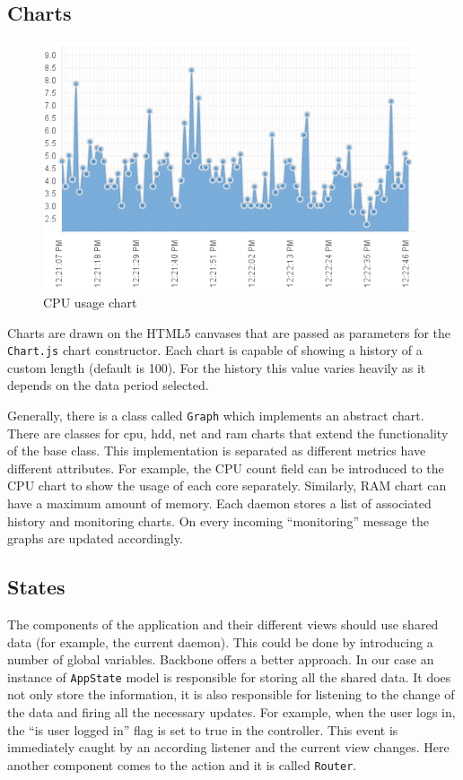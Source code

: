 \documentclass{l3proj}
\begin{document}
\subsection{Charts}

\begin{figure}[H]
\centering
\includegraphics[width=110mm]{images/cpu.png}
\caption{CPU usage chart}
\label{fig:CPUusage}
\end{figure}

Charts are drawn on the HTML5 canvases that are passed as parameters for the \texttt{Chart.js} chart constructor. Each chart is capable of showing a history of a custom length (default is 100). For the history this value varies heavily as it depends on the data period selected.

Generally, there is a class called \texttt{Graph} which implements an abstract chart. There are classes for cpu, hdd, net and ram charts that extend the functionality of the base class. This implementation is separated as different metrics have different attributes. For example, the CPU count field can be introduced to the CPU chart to show the usage of each core separately. Similarly, RAM chart can have a maximum amount of memory. Each daemon stores a list of associated history and monitoring charts. On every incoming ``monitoring'' message the graphs are updated accordingly.

\subsection{States}

The components of the application and their different views should use shared data (for example, the current daemon). This could be done by introducing a number of global variables. Backbone offers a better approach. In our case an instance of \texttt{AppState} model is responsible for storing all the shared data. It does not only store the information, it is also responsible for listening to the change of the data and firing all the necessary updates. For example, when the user logs in, the ``is user logged in'' flag is set to true in the controller. This event is immediately caught by an according listener and the current view changes. Here another component comes to the action and it is called \texttt{Router}.
\end{document}
